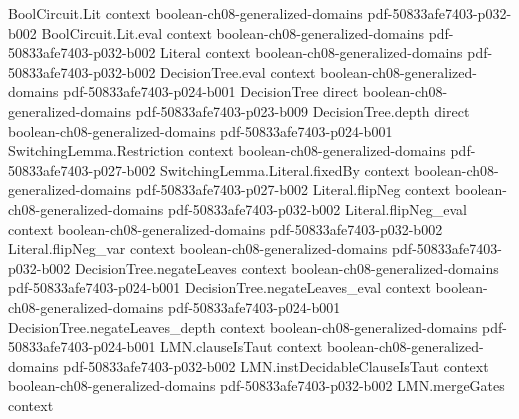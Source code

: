 \begin{theorem}
\label{BooleanAnalysis.stability_formula}
\leanok
{}
\proofstep
  {BoolCircuit.Lit}
  {context}
  {boolean-ch08-generalized-domains}
  {pdf-50833afe7403-p032-b002}
\proofstep
  {BoolCircuit.Lit.eval}
  {context}
  {boolean-ch08-generalized-domains}
  {pdf-50833afe7403-p032-b002}
\proofstep
  {Literal}
  {context}
  {boolean-ch08-generalized-domains}
  {pdf-50833afe7403-p032-b002}
\proofstep
  {DecisionTree.eval}
  {context}
  {boolean-ch08-generalized-domains}
  {pdf-50833afe7403-p024-b001}
\proofstep
  {DecisionTree}
  {direct}
  {boolean-ch08-generalized-domains}
  {pdf-50833afe7403-p023-b009}
\proofstep
  {DecisionTree.depth}
  {direct}
  {boolean-ch08-generalized-domains}
  {pdf-50833afe7403-p024-b001}
\proofstep
  {SwitchingLemma.Restriction}
  {context}
  {boolean-ch08-generalized-domains}
  {pdf-50833afe7403-p027-b002}
\proofstep
  {SwitchingLemma.Literal.fixedBy}
  {context}
  {boolean-ch08-generalized-domains}
  {pdf-50833afe7403-p027-b002}
\proofstep
  {Literal.flipNeg}
  {context}
  {boolean-ch08-generalized-domains}
  {pdf-50833afe7403-p032-b002}
\proofstep
  {Literal.flipNeg_eval}
  {context}
  {boolean-ch08-generalized-domains}
  {pdf-50833afe7403-p032-b002}
\proofstep
  {Literal.flipNeg_var}
  {context}
  {boolean-ch08-generalized-domains}
  {pdf-50833afe7403-p032-b002}
\proofstep
  {DecisionTree.negateLeaves}
  {context}
  {boolean-ch08-generalized-domains}
  {pdf-50833afe7403-p024-b001}
\proofstep
  {DecisionTree.negateLeaves_eval}
  {context}
  {boolean-ch08-generalized-domains}
  {pdf-50833afe7403-p024-b001}
\proofstep
  {DecisionTree.negateLeaves_depth}
  {context}
  {boolean-ch08-generalized-domains}
  {pdf-50833afe7403-p024-b001}
\proofstep
  {LMN.clauseIsTaut}
  {context}
  {boolean-ch08-generalized-domains}
  {pdf-50833afe7403-p032-b002}
\proofstep
  {LMN.instDecidableClauseIsTaut}
  {context}
  {boolean-ch08-generalized-domains}
  {pdf-50833afe7403-p032-b002}
\proofstep
  {LMN.mergeGates}
  {context}

\end{theorem}
